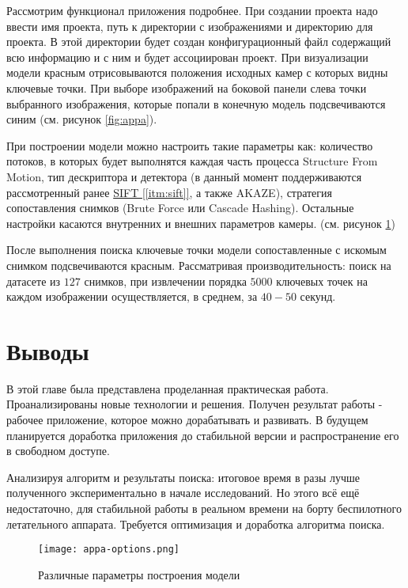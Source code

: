Рассмотрим функционал приложения подробнее. При создании проекта надо ввести имя проекта, путь к директории с изображениями и директорию для проекта. В этой директории будет создан конфигурационный файл содержащий всю информацию и с ним и будет ассоциирован проект. При визуализации модели красным отрисовываются положения исходных камер с которых видны ключевые точки. При выборе изображений на боковой панели слева точки выбранного изображения, которые попали в конечную модель подсвечиваются синим (см. рисунок \ref{fig:appa}).

При построении модели можно настроить такие параметры как: количество потоков, в которых будет выполнятся каждая часть процесса Structure From Motion, тип дескриптора и детектора (в данный момент поддерживаются рассмотренный ранее \hyperref[itm:sift]{SIFT [\ref{itm:sift}]}, а также AKAZE), стратегия сопоставления снимков (Brute Force или Cascade Hashing). Остальные настройки касаются внутренних и внешних параметров камеры. (см. рисунок \ref{fig:appa-options})

После выполнения поиска ключевые точки модели сопоставленные с искомым снимком подсвечиваются красным. Рассматривая производительность: поиск на датасете из $127$ снимков, при извлечении порядка $5000$ ключевых точек на каждом изображении осуществляется, в среднем, за $40-50$ секунд.

\section{Выводы}

В этой главе была представлена проделанная практическая работа. Проанализированы новые технологии и решения. Получен результат работы - рабочее приложение, которое можно дорабатывать и развивать. В будущем планируется доработка приложения до стабильной версии и распространение его в свободном доступе.

Анализируя алгоритм и результаты поиска: итоговое время в разы лучше полученного экспериментально в начале исследований. Но этого всё ещё недостаточно, для стабильной работы в реальном времени на борту беспилотного летательного аппарата. Требуется оптимизация и доработка алгоритма поиска.

\begin{figure}[h]
    \centering
    \texttt{[image: appa-options.png]}
    \caption{Различные параметры построения модели}
    \label{fig:appa-options}
\end{figure}
